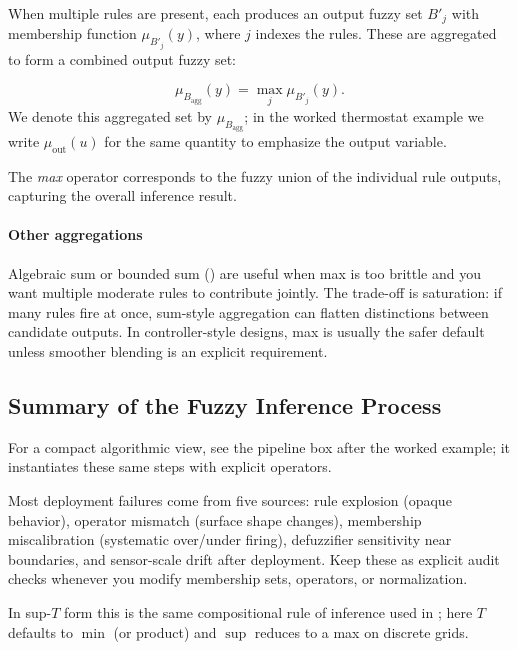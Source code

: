 When multiple rules are present, each produces an output fuzzy set $B'_j$ with membership function $\mu_{B'_j}(y)$, where $j$ indexes the rules. These are aggregated to form a combined output fuzzy set:

\begin{equation}
\mu_{B_{\text{agg}}}(y) = \max_j \mu_{B'_j}(y).
\label{eq:output_aggregation}
\end{equation}
We denote this aggregated set by \(\mu_{B_{\text{agg}}}\); in the worked thermostat example we write \(\mu_{\text{out}}(u)\) for the same quantity to emphasize the output variable.

The \emph{max} operator corresponds to the fuzzy union of the individual rule outputs, capturing the overall inference result.
\paragraph{Other aggregations}
Algebraic sum or bounded sum () are useful when max is too brittle and you want multiple moderate rules to contribute jointly. The trade-off is saturation: if many rules fire at once, sum-style aggregation can flatten distinctions between candidate outputs. In controller-style designs, max is usually the safer default unless smoother blending is an explicit requirement.

\subsection{Summary of the Fuzzy Inference Process}
\label{sec:fuzzyinference_summary_of_the_fuzzy_inference_process}

For a compact algorithmic view, see the pipeline box after the worked example; it instantiates these same steps with explicit operators.

\begin{tcolorbox}[summarybox, title={Failure modes to monitor}]
Most deployment failures come from five sources: rule explosion (opaque behavior), operator mismatch (surface shape changes), membership miscalibration (systematic over/under firing), defuzzifier sensitivity near boundaries, and sensor-scale drift after deployment. Keep these as explicit audit checks whenever you modify membership sets, operators, or normalization.
\end{tcolorbox}

In sup-$T$ form this is the same compositional rule of inference used in ; here \(T\) defaults to \(\min\) (or product) and \(\sup\) reduces to a max on discrete grids.

